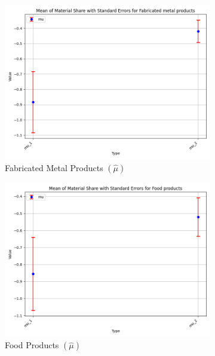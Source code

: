 \documentclass{article}
\begin{document}
\begin{figure}[ht!]
    \begin{subfigure}[t]{0.32\textwidth}
        \centering
        \includegraphics[width=\textwidth]{figure/empirical_ar1_normal_mu_with_error_bars_Fabricated metal products.png}
        \caption{Fabricated Metal Products $(\hat\mu)$}
    \end{subfigure}
    \begin{subfigure}[t]{0.32\textwidth}
        \centering
        \includegraphics[width=\textwidth]{figure/empirical_ar1_normal_mu_with_error_bars_Food products.png}
        \caption{Food Products $(\hat\mu)$}
    \end{subfigure}
    \begin{subfigure}[t]{0.32\textwidth}
        \centering

\end{subfigure}
\end{figure}
\end{document}
